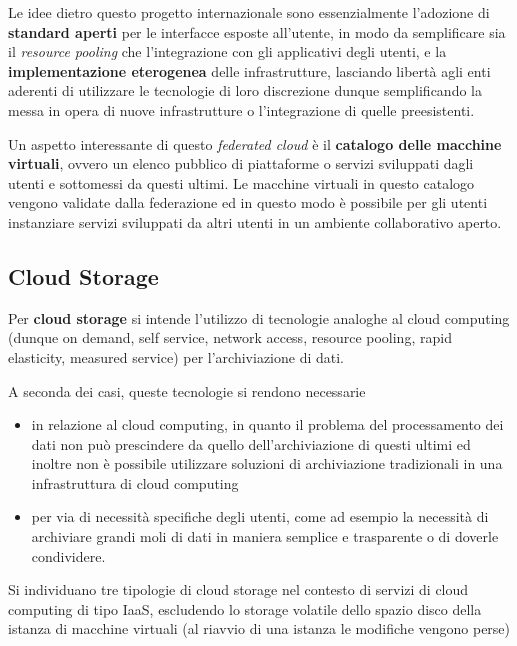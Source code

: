 \documentclass[italian,]{article}
\providecommand{\tightlist}{%
  \setlength{\itemsep}{0pt}\setlength{\parskip}{0pt}}
\begin{document}
Le idee dietro questo progetto internazionale sono essenzialmente
l'adozione di \textbf{standard aperti} per le interfacce esposte
all'utente, in modo da semplificare sia il \emph{resource pooling} che
l'integrazione con gli applicativi degli utenti, e la
\textbf{implementazione eterogenea} delle infrastrutture, lasciando
libertà agli enti aderenti di utilizzare le tecnologie di loro
discrezione dunque semplificando la messa in opera di nuove
infrastrutture o l'integrazione di quelle preesistenti.

Un aspetto interessante di questo \emph{federated cloud} è il
\textbf{catalogo delle macchine virtuali}, ovvero un elenco pubblico di
piattaforme o servizi sviluppati dagli utenti e sottomessi da questi
ultimi. Le macchine virtuali in questo catalogo vengono validate dalla
federazione ed in questo modo è possibile per gli utenti instanziare
servizi sviluppati da altri utenti in un ambiente collaborativo aperto.

\subsection{Cloud Storage}\label{cloud-storage}

Per \textbf{cloud storage} si intende l'utilizzo di tecnologie analoghe
al cloud computing (dunque on demand, self service, network access,
resource pooling, rapid elasticity, measured service) per
l'archiviazione di dati.

A seconda dei casi, queste tecnologie si rendono necessarie

\begin{itemize}
\tightlist
\item
  in relazione al cloud computing, in quanto il problema del
  processamento dei dati non può prescindere da quello
  dell'archiviazione di questi ultimi ed inoltre non è possibile
  utilizzare soluzioni di archiviazione tradizionali in una
  infrastruttura di cloud computing
\item
  per via di necessità specifiche degli utenti, come ad esempio la
  necessità di archiviare grandi moli di dati in maniera semplice e
  trasparente o di doverle condividere.
\end{itemize}

Si individuano tre tipologie di cloud storage nel contesto di servizi di
cloud computing di tipo IaaS, escludendo lo storage volatile dello
spazio disco della istanza di macchine virtuali (al riavvio di una
istanza le modifiche vengono perse)
\end{document}
